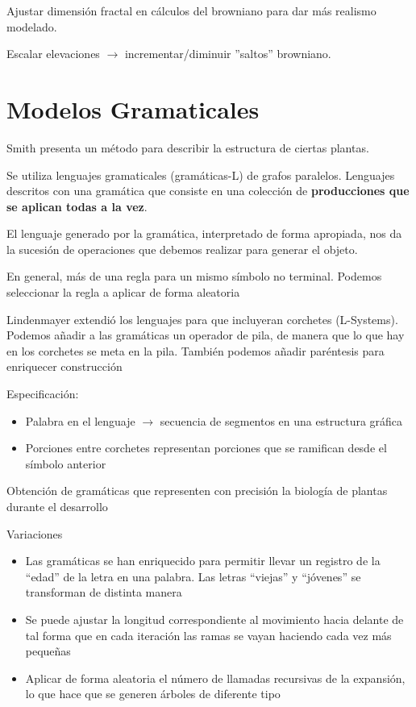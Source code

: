 Ajustar dimensión fractal en cálculos del browniano para dar más realismo modelado.

Escalar elevaciones $\rightarrow$ incrementar/diminuir ''saltos'' browniano.

\section{Modelos Gramaticales}
Smith presenta un método para describir la estructura de ciertas plantas.

Se utiliza lenguajes gramaticales (gramáticas-L) de grafos paralelos. Lenguajes descritos con una gramática que consiste en una colección de \textbf{producciones que se aplican todas a la vez}.

El lenguaje generado por la gramática, interpretado de forma apropiada, nos da la sucesión de operaciones que debemos realizar para generar el objeto.

En general, más de una regla para un mismo símbolo no terminal. Podemos seleccionar la regla a aplicar de forma aleatoria

Lindenmayer extendió los lenguajes para que incluyeran corchetes (L-Systems). Podemos añadir a las gramáticas un operador de pila, de manera que lo que hay en los corchetes se meta en la pila. También podemos añadir paréntesis para enriquecer construcción

Especificación:
\begin{itemize}
    \item Palabra en el lenguaje $\rightarrow$ secuencia de segmentos en una estructura gráfica
    \item Porciones entre corchetes representan porciones que se ramifican desde el símbolo anterior
\end{itemize}

Obtención de gramáticas que representen con precisión la biología de plantas durante el desarrollo

Variaciones
\begin{itemize}
    \item Las gramáticas se han enriquecido para permitir llevar un registro de la “edad” de la letra en una palabra. Las letras “viejas” y “jóvenes” se transforman de distinta manera
    \item Se puede ajustar la longitud correspondiente al movimiento hacia delante de tal forma que en cada iteración las ramas se vayan haciendo cada vez más pequeñas
    \item Aplicar de forma aleatoria el número de llamadas recursivas de la expansión, lo que hace que se generen árboles de diferente tipo
\end{itemize}

